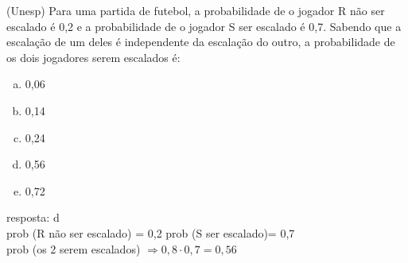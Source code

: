 \begin{ex}
(Unesp) Para uma partida de futebol, a probabilidade de o jogador R não ser escalado é 0,2 e a probabilidade de o jogador S ser escalado é 0,7. Sabendo que a escalação de um deles é independente da escalação do outro, a probabilidade de os dois jogadores serem escalados é:
   \begin{enumerate}[(a)]
   \item 0,06
   \item 0,14
   \item 0,24
   \item 0,56
   \item 0,72
   \end{enumerate}
     \begin{sol}
      resposta: d\\
      prob (R não ser escalado) = 0,2 \hspace{0,4cm} prob (S ser escalado)= 0,7\\
      prob (os 2 serem escalados) $\Longrightarrow 0,8\cdot 0,7= 0,56$
     \end{sol}
\end{ex}